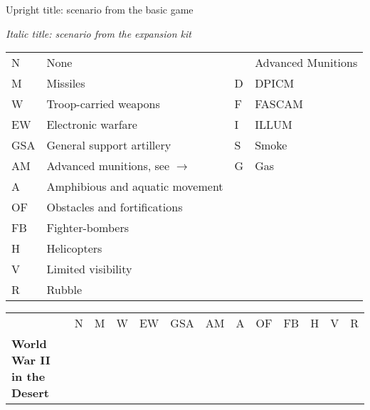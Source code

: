 \documentclass[a4paper]{article}
\newenvironment{texte}{\rmfamily\footnotesize}{}
\begin{document}
\begin{texte}


Upright title: scenario from the basic game

\textit{Italic title: scenario from the expansion kit}

\vspace*{5mm}

\begin{tabular}{llll}
N    &   None                                  &   & Advanced Munitions\\
M    &   Missiles                              & D & DPICM  \\
W    &   Troop-carried weapons                 & F & FASCAM \\
EW   &   Electronic warfare                    & I & ILLUM  \\
GSA  &   General support artillery             & S & Smoke  \\ 
AM   &   Advanced munitions, see $\rightarrow$ & G & Gas    \\ 
A    &   Amphibious and aquatic movement  \\
OF   &   Obstacles and fortifications     \\
FB   &   Fighter-bombers                  \\
H    &   Helicopters                      \\
V    &   Limited visibility               \\
R    &   Rubble                           \\
\end{tabular}

\begin{tabular}{lcccccccccccc}
                                                   & N &  M &  W & EW & GSA & AM & A & OF & FB & H &  V & R \\

\bf World War II in the Desert \\


\end{tabular}
\end{texte}
\end{document}
